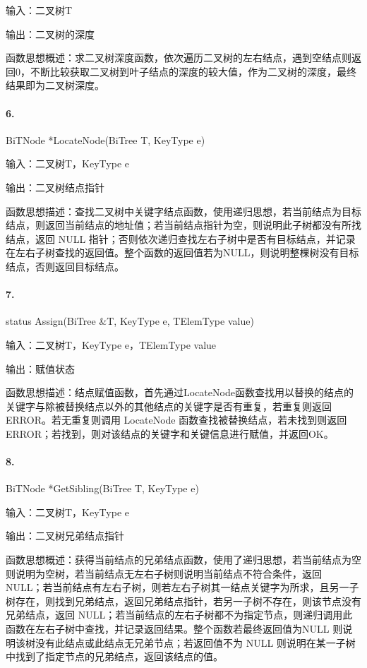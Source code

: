 \documentclass[supercite]{Experimental_Report}
\theoremstyle{definition}
\begin{document}
输入：二叉树T

输出：二叉树的深度

函数思想概述：求二叉树深度函数，依次遍历二叉树的左右结点，遇到空结点则返回0，不断比较获取二叉树到叶子结点的深度的较大值，作为二叉树的深度，最终结果即为二叉树深度。

\paragraph{ 6.}BiTNode *LocateNode(BiTree T, KeyType e)

输入：二叉树T，KeyType e

输出：二叉树结点指针

函数思想描述：查找二叉树中关键字结点函数，使用递归思想，若当前结点为目标结点，则返回当前结点的地址值；若当前结点指针为空，则说明此子树都没有所找结点，返回 NULL 指针；否则依次递归查找左右子树中是否有目标结点，并记录在左右子树查找的返回值。整个函数的返回值若为NULL，则说明整棵树没有目标结点，否则返回目标结点。

\paragraph{ 7.}status Assign(BiTree \&T, KeyType e, TElemType value)

输入：二叉树T，KeyType e，TElemType value

输出：赋值状态

函数思想描述：结点赋值函数，首先通过LocateNode函数查找用以替换的结点的关键字与除被替换结点以外的其他结点的关键字是否有重复，若重复则返回 ERROR。若无重复则调用 LocateNode 函数查找被替换结点，若未找到则返回 ERROR；若找到，则对该结点的关键字和关键信息进行赋值，并返回OK。

\paragraph{ 8.}BiTNode *GetSibling(BiTree T, KeyType e)

输入：二叉树T，KeyType e

输出：二叉树兄弟结点指针

函数思想概述：获得当前结点的兄弟结点函数，使用了递归思想，若当前结点为空则说明为空树，若当前结点无左右子树则说明当前结点不符合条件，返回 NULL；若当前结点有左右子树，则若左右子树其一结点关键字为所求，且另一子树存在，则找到兄弟结点，返回兄弟结点指针，若另一子树不存在，则该节点没有兄弟结点，返回 NULL；若当前结点的左右子树都不为指定节点，则递归调用此函数在左右子树中查找，并记录返回结果。整个函数若最终返回值为NULL 则说明该树没有此结点或此结点无兄弟节点；若返回值不为 NULL 则说明在某一子树中找到了指定节点的兄弟结点，返回该结点的值。
\end{document}
